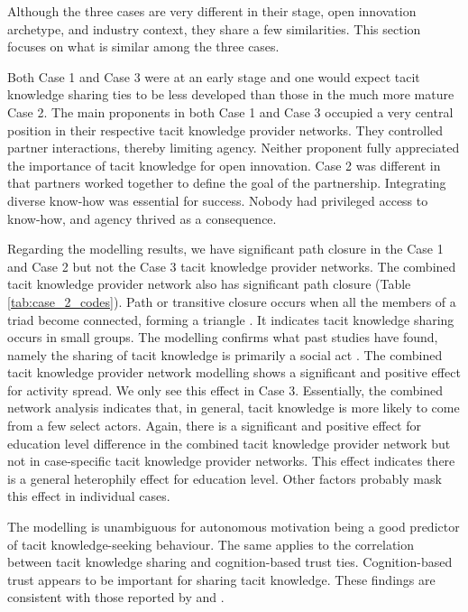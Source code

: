 Although the three cases are very different in their stage, open innovation archetype, and industry context, they share a few similarities. This section focuses on what is similar among the three cases. \medskip

Both Case 1 and Case 3 were at an early stage and one would expect tacit knowledge sharing ties to be less developed than those in the much more mature Case 2. The main proponents in both Case 1 and Case 3 occupied a very central position in their respective tacit knowledge provider networks. They controlled partner interactions, thereby limiting agency. Neither proponent fully appreciated the importance of tacit knowledge for open innovation. Case 2 was different in that partners worked together to define the goal of the partnership. Integrating diverse know-how was essential for success. Nobody had privileged access to know-how, and agency thrived as a consequence. \medskip

Regarding the modelling results, we have significant path closure in the Case 1 and Case 2 but not the Case 3 tacit knowledge provider networks. The combined tacit knowledge provider network also has significant path closure (Table \ref{tab:case_2_codes}). Path or transitive closure occurs when all the members of a triad become connected, forming a triangle \citep{yin2020measuring}. It indicates tacit knowledge sharing occurs in small groups. The modelling confirms what past studies have found, namely the sharing of tacit knowledge is primarily a social act \citep{nonaka1994dynamic,kaser2001knowledge,zhang2016critical}. The combined tacit knowledge provider network modelling shows a significant and positive effect for activity spread. We only see this effect in Case 3. Essentially, the combined network analysis indicates that, in general, tacit knowledge is more likely to come from a few select actors. Again, there is a significant and positive effect for education level difference in the combined tacit knowledge provider network but not in case-specific tacit knowledge provider networks. This effect indicates there is a general heterophily effect for education level. Other factors probably mask this effect in individual cases. \medskip

The modelling is unambiguous for autonomous motivation being a good predictor of tacit knowledge-seeking behaviour. The same applies to the correlation between tacit knowledge sharing and cognition-based trust ties. Cognition-based trust appears to be important for sharing tacit knowledge. These findings are consistent with those reported by \citet{holste2010trust} and \citet{gubbins2021delineating}. \medskip

